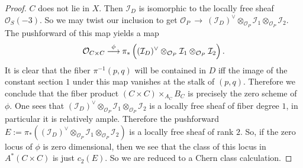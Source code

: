 \documentclass[twoside,12pt,reqno]{amsart}
\theoremstyle{plain}
\theoremstyle{definition}
\def\ps{\vspace{4pt}}
\newcommand{\lt}{\left}
\newcommand{\rt}{\right}
\newcommand{\OO}{\mathcal O}
\renewcommand{\xrightarrow}[1]{\mathbin{\stackrel{#1}{\longrightarrow}}}
\begin{document}
\begin{proof}
$C$ does not lie in $X$.  
Then $\mathcal{I}_D$ is isomorphic to the locally
free sheaf $\OO_{S}(-3)$.  So we may twist our inclusion to get
$\OO_P~\rightarrow~ (\mathcal{I}_D)^\vee\otimes_{\OO_P}\mathcal{I}_1\otimes_{\OO_P}\mathcal{I}_2$.
The pushforward of this map yields a map 
\begin{equation}
\OO_{C\times
C}\xrightarrow{\phi}\pi_*\lt({(\mathcal{I}_D)^\vee\otimes_{\OO_P}\mathcal{I}_1 \otimes_{\OO_P}
\mathcal{I}_2\rule{0cm}{0.35cm}}\rt).
\end{equation}
It is clear that the fiber $\pi^{-1}(p,q)$ will be contained in
$D$ iff the image of the constant section $1$ under this map vanishes
at the stalk of $(p,q)$.  Therefore we conclude that the fiber product
$(C\times C)\times_{A_C} B_C$ is precisely the zero scheme of
$\phi$.  One sees that $(\mathcal{I}_D)^\vee\otimes_{\OO_P}\mathcal{I}_1\otimes_{\OO_P}
\mathcal{I}_2$ is a locally free sheaf of fiber degree $1$, in particular it is
relatively ample.  Therefore the pushforward
$E:=\pi_*((\mathcal{I}_D)^\vee\otimes_{\OO_P}\mathcal{I}_1\otimes_{\OO_P} \mathcal{I}_2)$ is a
locally free sheaf of rank $2$.  So, if the zero locus of $\phi$ is
zero dimensional, then we see that the class of this locus in
$A^*(C\times C)$ is just $c_2(E)$.  So we are reduced to a Chern
class calculation.

\ps


\end{proof}
\end{document}
